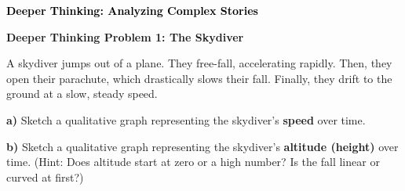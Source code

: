 \documentclass[12pt, letterpaper, fleqn]{article}
\begin{document}
\newpage

\begin{tcolorbox}[colback=customteal!20]
\large\textcolor{black}{\textbf{Deeper Thinking: Analyzing Complex Stories}}
\end{tcolorbox}

\vspace{3mm}

\begin{tcolorbox}[colback=white!15, colframe=black, boxrule=1.5pt, arc=4mm, left=6mm, right=6mm, top=5mm, bottom=5mm]

\textbf{Deeper Thinking Problem 1: The Skydiver}

\medskip

\noindent
A skydiver jumps out of a plane. They free-fall, accelerating rapidly. Then, they open their parachute, which drastically slows their fall. Finally, they drift to the ground at a slow, steady speed.

\vspace{5mm}

\noindent
\textbf{a)} Sketch a qualitative graph representing the skydiver's \textbf{speed} over time.

\vspace{4cm}

\noindent
\textbf{b)} Sketch a qualitative graph representing the skydiver's \textbf{altitude (height)} over time. (Hint: Does altitude start at zero or a high number? Is the fall linear or curved at first?)

\vspace{4cm}

\end{tcolorbox}
\end{document}
